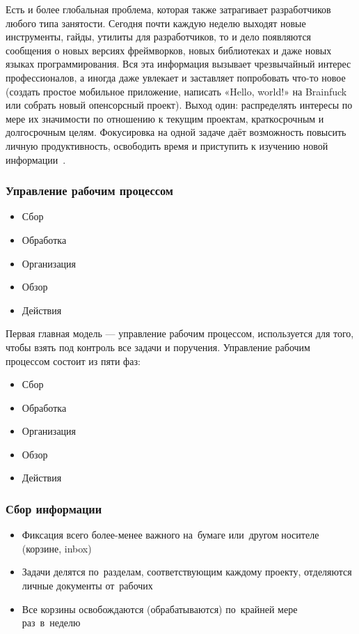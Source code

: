 \documentclass{../industrial-development}
\begin{document}
Есть и более глобальная проблема, которая также затрагивает разработчиков любого типа занятости. Сегодня почти каждую неделю выходят новые инструменты, гайды, утилиты для разработчиков, то и дело появляются сообщения о новых версиях фреймворков, новых библиотеках и даже новых языках программирования. Вся эта информация вызывает чрезвычайный интерес профессионалов, а иногда даже увлекает и заставляет попробовать что-то новое (создать простое мобильное приложение, написать «Hello, world!» на Brainfuck или собрать новый опенсорсный проект). Выход один: распределять интересы по мере их значимости по отношению к текущим проектам, краткосрочным и долгосрочным целям. Фокусировка на одной задаче даёт возможность повысить личную продуктивность, освободить время и приступить к изучению новой информации~\cite{GTDHabr}.

\begin{frame} \frametitle{Управление рабочим процессом}
  \begin{itemize}
  \item Сбор
  \item Обработка
  \item Организация
  \item Обзор
  \item Действия
  \end{itemize}
\end{frame}

\lecturenotes

Первая главная модель — управление рабочим процессом, используется для того, чтобы взять под контроль все задачи и поручения. Управление рабочим процессом состоит из пяти фаз:
\begin{itemize}
\item Сбор
\item Обработка
\item Организация
\item Обзор
\item Действия~\cite{GTDWikipedia}
\end{itemize}

\begin{frame} \frametitle{Сбор информации}
  \begin{itemize}
  \item Фиксация всего более-менее важного на~бумаге или~другом носителе (корзине, inbox)
  \item Задачи делятся по~разделам, соответствующим каждому проекту, отделяются личные документы от~рабочих
  \item Все корзины освобождаются (обрабатываются) по~крайней мере раз~в~неделю
  \end{itemize}
\end{frame}
\end{document}
